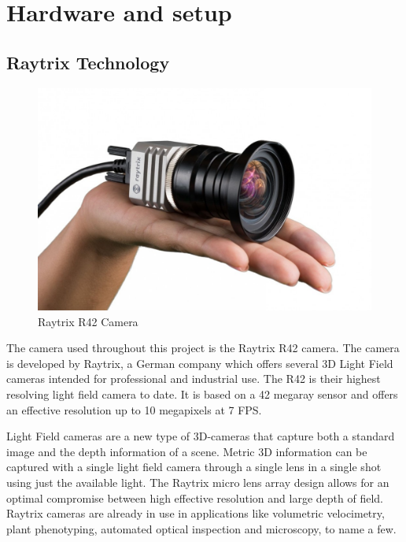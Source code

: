 \section{Hardware and setup} \label{hardware}

\subsection{Raytrix Technology}\label{the_raytrix_camera}

\begin{figure}[ht]
    \centering
    \includegraphics[width=.9\linewidth]{images/hardware/raytrix_camera}
    \caption{Raytrix R42 Camera\cite{website:raytrix_r42}}
    \label{fig:raytrix_camera}
\end{figure}

The camera used throughout this project is the Raytrix R42 camera. The camera is developed by Raytrix, a German company which offers several 3D Light Field cameras intended for professional and industrial use. The R42 is their highest resolving light field camera to date. It is based on a 42 megaray sensor and offers an effective resolution up to 10 megapixels at 7 FPS.\cite{website:raytrix_r42}

Light Field cameras are a new type of 3D-cameras that capture both a standard image and the depth information of a scene. Metric 3D information can be captured with a single light field camera through a single lens in a single shot using just the available light. The Raytrix micro lens array design allows for an optimal compromise between high effective resolution and large depth of field. Raytrix cameras are already in use in applications like volumetric velocimetry, plant phenotyping, automated optical inspection and microscopy, to name a few.\cite{website:raytrix_main}

